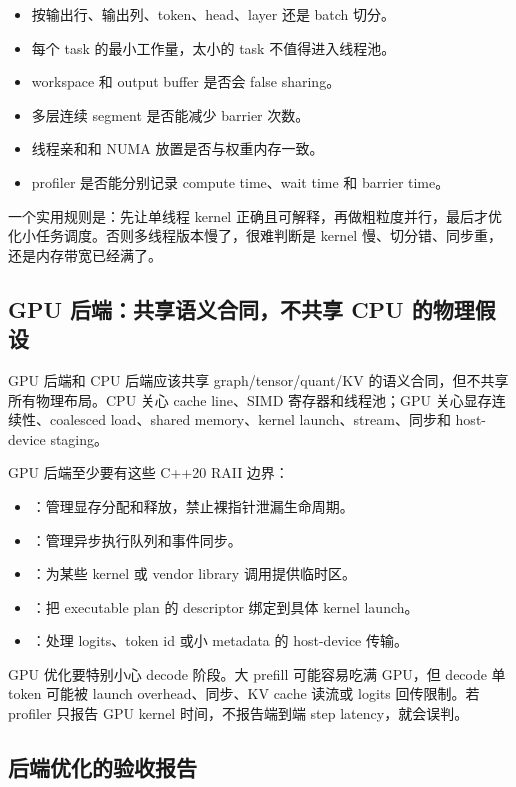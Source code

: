 \begin{itemize}
  \item 按输出行、输出列、token、head、layer 还是 batch 切分。
  \item 每个 task 的最小工作量，太小的 task 不值得进入线程池。
  \item workspace 和 output buffer 是否会 false sharing。
  \item 多层连续 segment 是否能减少 barrier 次数。
  \item 线程亲和和 NUMA 放置是否与权重内存一致。
  \item profiler 是否能分别记录 compute time、wait time 和 barrier time。
\end{itemize}

一个实用规则是：先让单线程 kernel 正确且可解释，再做粗粒度并行，最后才优化小任务调度。否则多线程版本慢了，很难判断是 kernel 慢、切分错、同步重，还是内存带宽已经满了。

\subsection{GPU 后端：共享语义合同，不共享 CPU 的物理假设}

GPU 后端和 CPU 后端应该共享 graph/tensor/quant/KV 的语义合同，但不共享所有物理布局。CPU 关心 cache line、SIMD 寄存器和线程池；GPU 关心显存连续性、coalesced load、shared memory、kernel launch、stream、同步和 host-device staging。

GPU 后端至少要有这些 C++20 RAII 边界：

\begin{itemize}
  \item {}：管理显存分配和释放，禁止裸指针泄漏生命周期。
  \item {}：管理异步执行队列和事件同步。
  \item {}：为某些 kernel 或 vendor library 调用提供临时区。
  \item {}：把 executable plan 的 descriptor 绑定到具体 kernel launch。
  \item {}：处理 logits、token id 或小 metadata 的 host-device 传输。
\end{itemize}

GPU 优化要特别小心 decode 阶段。大 prefill 可能容易吃满 GPU，但 decode 单 token 可能被 launch overhead、同步、KV cache 读流或 logits 回传限制。若 profiler 只报告 GPU kernel 时间，不报告端到端 step latency，就会误判。

\subsection{后端优化的验收报告}

